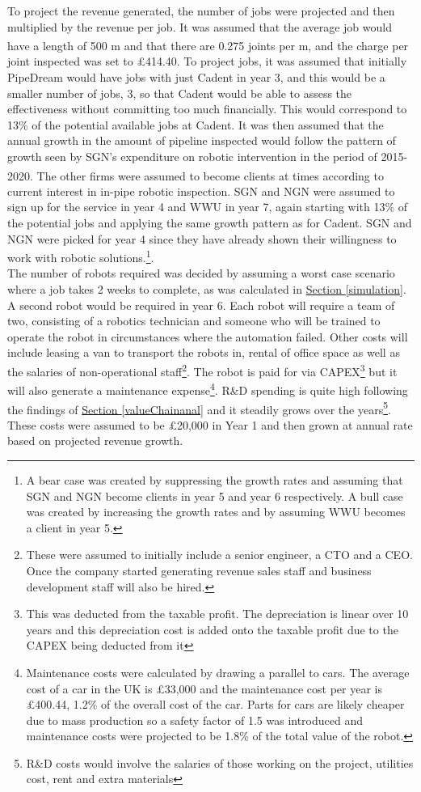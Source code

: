\documentclass[11pt]{article}		%
\newcommand{\supercite}[1]{\textsuperscript{\cite{#1}}}		%
\newcommand{\sectref}[1]{\hyperref[#1]{Section \ref*{#1}}}     %
\begin{document}
    To project the revenue generated, the number of jobs were projected and then multiplied by the revenue per job. It was assumed that the average job would have a length of 500 m and that there are 0.275 joints per m\supercite{SGN_Southern}, and the charge per joint inspected was set to £414.40.
    To project jobs, it was assumed that initially PipeDream would have jobs with just Cadent in year 3, and this would be a smaller number of jobs, 3, so that  Cadent would be able to assess the effectiveness without committing too much financially. This would correspond to 13\% of the potential available jobs at Cadent. It was then assumed  that the annual growth in the amount of pipeline inspected would follow the pattern of growth seen by SGN’s expenditure on robotic intervention in the period of 2015-2020\supercite{SGN_Southern}.
  The other firms were assumed to become clients at times according to current interest in in-pipe robotic inspection. SGN and NGN were assumed to sign up for the service in year 4 and WWU in year 7, again starting with 13\% of the potential jobs and applying the same growth pattern as for Cadent. SGN and NGN were picked  for year 4 since they have already shown their willingness to work with robotic solutions.\footnote{ A bear case was created by suppressing the growth rates and assuming that SGN and NGN become clients in year 5 and year 6 respectively. A bull case was created by increasing the growth rates and by assuming WWU becomes a client in year 5.}.
    \\ 
    \hspace*{2ex}The number of robots required was decided by assuming a worst case scenario where a job takes 2 weeks to complete, as was calculated in \sectref{simulation}. A second robot would be required in year 6. Each robot will require a team of two, consisting of a robotics technician and someone who will be trained to operate the robot in circumstances where the automation failed. Other costs will include leasing a van to transport the robots in, rental of office space as well as the salaries of non-operational staff\footnote{These were assumed to initially include a senior engineer, a CTO and a CEO. Once the company started generating revenue sales staff and business development staff will also be hired.}. The robot is paid for via CAPEX\footnote{This was deducted from the taxable profit. The depreciation is linear over 10 years and this depreciation cost is added onto the taxable profit due to the CAPEX being deducted from it} but it will also generate a maintenance expense\footnote{Maintenance costs were calculated by drawing a parallel to cars. The average cost of a car in the UK is £33,000 and the maintenance cost per year is £400.44, 1.2\% of the overall cost of the car. Parts for cars are likely cheaper due to mass production so a safety factor of 1.5 was introduced and maintenance costs were projected to be 1.8\% of the total value of the robot.}.  R\&D spending is quite high following the findings of \sectref{valueChainanal} and it steadily grows over the years\footnote{R\&D costs would involve the salaries of those working on the project, utilities cost, rent and extra materials}. These costs were assumed to be £20,000 in Year 1 and then grown at annual rate based on projected revenue growth.
\end{document}
